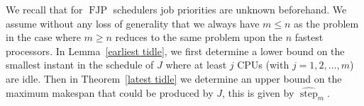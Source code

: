 \documentclass[10pt,english,a4paper]{article}
\newcommand{\ds}{\displaystyle}
\newcommand{\equals}{\stackrel{\mathrm{def}}{=}}
\newtheorem{lemma}{Lemma}
\newenvironment{proof}[1][Proof]{\begin{trivlist}
\item[\hskip \labelsep {\bfseries #1}]}{\end{trivlist}}
\newtheorem{validity test}{Validity Test}
\newcommand{\FJP}{\operatorname{FJP}}
\newcommand{\step}{\widehat{\operatorname{step}}}
\newcommand{\minstep}{\operatorname{step}}
\newcommand{\fin}{\hfill{\small $\blacksquare$}}     \newcommand{\oh}[1]{\ensuremath{\mathcal{0}{(#1)}}} \def\thefootnote{\arabic{footnote}}
\begin{document}
 
We recall that for $\FJP$ schedulers job priorities are unknown beforehand. We assume without any loss of generality that we always have $m \le n$ as the problem in the case where $m \ge n$ reduces to the same problem upon the $n$ fastest processors. In Lemma~\ref{earliest tidle}, we first determine a lower bound on the smallest instant in the schedule of $J$ where at least $j$ CPUs (with $j = 1, 2, \ldots, m$) are idle. Then in Theorem~\ref{latest tidle} we determine an upper bound on the maximum makespan that could be produced by $J$, this is given by $\step_m$. 

\begin{comment}
\begin{lemma}\label{earliest submakespan}
Let $\pi = [s_1, s_2, \ldots, s_m]$ be an $m$-processor uniform platform with processor capacities such that $s_j \le s_{j+1}$ for all $j, \: 1 \le j \le m-1$. Let $J = \{J_1, J_2, \ldots, J_r\}$ be any set of $r$ jobs, all released at time $t_0 = 0$, with computation requirements $C_1, C_2, \ldots, C_r$, respectively. If these jobs are scheduled according to a work-conserving $\FJP$ scheduler, then a lower bound $\hat{L}_m$ on the makespan is given by
\begin{equation}
\hat{L}_m \equals \ds\frac{1}{S_{\pi}} \cdot \ds\sum_{k=1}^{r} C_k
\end{equation}
where $S_{\pi} \equals \ds\sum_{i=1}^{m} s_i$.
\end{lemma}
\begin{proof}
Let ${\cal S}$ denote the schedule of the $r$ jobs obtained from any work-conserving $\FJP$ scheduler. Let $\hat{t}$ denote the smallest instant in ${\cal S}$ at which all the jobs are completed and suppose, by contradiction, that $\hat{t} < \hat{L}_m$. If $\minstep_i$ denotes the smallest instant in ${\cal S}$ at which processor $\pi_i$ is idle then it holds that $\hat{t} = \ds\max_{i=1}^m\{ \minstep_i \}$. Since $\hat{t} < \hat{L}_m$, we have
\begin{eqnarray}
\max_{i=1}^m\{ \minstep_i \} & < & \hat{L}_m \nonumber \\
& < & \ds\frac{1}{S_{\pi}} \cdot \sum_{k=1}^{r} C_k \nonumber
\end{eqnarray}
By multiplying both sides of the above inequality by $S_{\pi}$, we get
\[ S_{\pi} \cdot \max_{i=1}^m\{ \minstep_i \} < \ds\sum_{k=1}^{r} C_k \]
Since we know that $\ds\sum_{k=1}^{r} C_k = \ds\sum_{k=1}^{m} \minstep_k \cdot s_k$, the right-hand side of the above inequality can be rewritten as
\begin{eqnarray}
S_{\pi} \cdot \max_{i=1}^m\{ \minstep_i \} & < & \ds\sum_{k=1}^{m} \minstep_k \cdot s_k \nonumber \\
& < & \sum_{k=1}^{m} \max_{i=1}^m\{ \minstep_i \} \cdot s_k \nonumber \\
& < & \max_{i=1}^m\{ \minstep_i \} \cdot \ds\sum_{k=1}^{m}  s_k \nonumber \\
& < & \max_{i=1}^m\{ \minstep_i \} \cdot S_{\pi} \nonumber
\end{eqnarray}
And the Lemma follows from this contradiction. \fin
\end{proof}
\end{comment}
\end{document}
